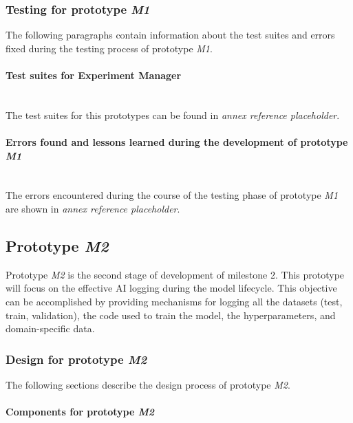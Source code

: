 \subsubsection{Testing for prototype \emph{M1}}

The following paragraphs contain information about the test suites and errors fixed during the testing process of prototype \emph{M1}.

\paragraph{Test suites for Experiment Manager}\mbox{}\\

The test suites for this prototypes can be found in \emph{annex reference placeholder}. %

\paragraph{Errors found and lessons learned during the development of prototype \emph{M1}}\mbox{}\\

The errors encountered during the course of the testing phase of prototype \emph{M1} are shown in \emph{annex reference placeholder}. %

\subsection{Prototype \emph{M2}}

Prototype \emph{M2} is the second stage of development of milestone 2. This prototype will focus on the 
effective \acrshort{AI} logging during the model lifecycle. This objective can be accomplished by providing mechanisms for logging all 
the datasets (test, train, validation), the code used to train the model, the hyperparameters, and domain-specific data.

\subsubsection{Design for prototype \emph{M2}}

The following sections describe the design process of prototype \emph{M2}.

\paragraph{Components for prototype \emph{M2}} \mbox{}\\

